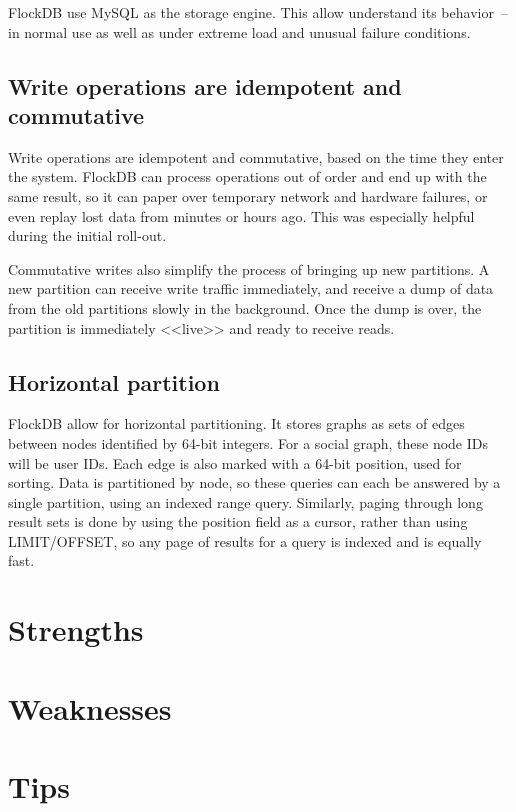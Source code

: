 FlockDB use MySQL as the storage engine. This allow understand its behavior~-- in normal use as well as under extreme load and unusual failure conditions.

\subsection{Write operations are idempotent and commutative}

Write operations are idempotent and commutative, based on the time they enter the system. FlockDB can process operations out of order and end up with the same result, so it can paper over temporary network and hardware failures, or even replay lost data from minutes or hours ago. This was especially helpful during the initial roll-out.

Commutative writes also simplify the process of bringing up new partitions. A new partition can receive write traffic immediately, and receive a dump of data from the old partitions slowly in the background. Once the dump is over, the partition is immediately <<live>> and ready to receive reads.

\subsection{Horizontal partition}

FlockDB allow for horizontal partitioning. It stores graphs as sets of edges between nodes identified by 64-bit integers. For a social graph, these node IDs will be user IDs. Each edge is also marked with a 64-bit position, used for sorting. Data is partitioned by node, so these queries can each be answered by a single partition, using an indexed range query. Similarly, paging through long result sets is done by using the position field as a cursor, rather than using LIMIT/OFFSET, so any page of results for a query is indexed and is equally fast.

\section{Strengths}

\section{Weaknesses}

\section{Tips}

